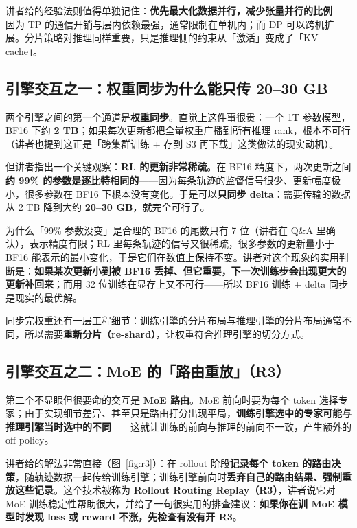 \documentclass[a4paper]{article}
\begin{document}
讲者给的经验法则值得单独记住：\textbf{优先最大化数据并行，减少张量并行的比例}——因为 TP 的通信开销与层内依赖最强，通常限制在单机内；而 DP 可以跨机扩展。分片策略对推理同样重要，只是推理侧的约束从「激活」变成了「KV cache」。

\subsection{引擎交互之一：权重同步为什么能只传 20--30 GB}

两个引擎之间的第一个通道是\textbf{权重同步}。直觉上这件事很贵：一个 1T 参数模型，BF16 下约 \textbf{2 TB}；如果每次更新都把全量权重广播到所有推理 rank，根本不可行（讲者也提到这正是「跨集群训练 + 存到 S3 再下载」这类做法的现实动机）。

但讲者指出一个关键观察：\textbf{RL 的更新非常稀疏}。在 BF16 精度下，两次更新之间\textbf{约 99\% 的参数是逐比特相同的}——因为每条轨迹的监督信号很少、更新幅度极小，很多参数在 BF16 下根本没有变化。于是可以\textbf{只同步 delta}：需要传输的数据从 2 TB 降到大约 \textbf{20--30 GB}，就完全可行了。

\begin{knowledgebox}{为什么「99\% 参数没变」是合理的}
BF16 的尾数只有 7 位（讲者在 Q\&A 里确认），表示精度有限；RL 里每条轨迹的信号又很稀疏，很多参数的更新量小于 BF16 能表示的最小变化，于是它们在数值上保持不变。讲者对这个现象的实用判断是：\textbf{如果某次更新小到被 BF16 丢掉、但它重要，下一次训练步会出现更大的更新补回来}；而用 32 位训练在显存上又不可行——所以 BF16 训练 + delta 同步是现实的最优解。
\end{knowledgebox}

同步完权重还有一层工程细节：训练引擎的分片布局与推理引擎的分片布局通常不同，所以需要\textbf{重新分片（re-shard）}，让权重符合推理引擎的切分方式。

\subsection{引擎交互之二：MoE 的「路由重放」（R3）}

第二个不显眼但很要命的交互是 \textbf{MoE 路由}。MoE 前向时要为每个 token 选择专家；由于实现细节差异、甚至只是路由打分出现平局，\textbf{训练引擎选中的专家可能与推理引擎当时选中的不同}——这就让训练的前向与推理的前向不一致，产生额外的 off-policy。

讲者给的解法非常直接（图~\ref{fig:r3}）：在 rollout 阶段\textbf{记录每个 token 的路由决策}，随轨迹数据一起传给训练引擎；训练引擎前向时\textbf{丢弃自己的路由结果、强制重放这些记录}。这个技术被称为 \textbf{Rollout Routing Replay（R3）}，讲者说它对 MoE 训练稳定性帮助很大，并给了一句很实用的排查建议：\textbf{如果你在训 MoE 模型时发现 loss 或 reward 不涨，先检查有没有开 R3}。
\end{document}
